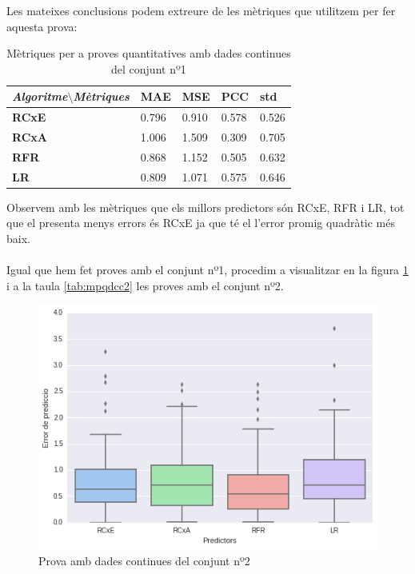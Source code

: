 \documentclass[12pt,a4paper,catalan]{article}
\begin{document}
Les mateixes conclusions podem extreure de les mètriques que utilitzem per fer aquesta prova:

\begin{table}[h]
\centering
\begin{tabular}{lllll}
\hline
\textit{\textbf{Algoritme$\setminus$Mètriques}} & \textbf{MAE} & \textbf{MSE} & \textbf{PCC} & \textbf{std} \\ \hline
\textbf{RCxE}          & 0.796          & 0.910          & 0.578          & 0.526          \\
\textbf{RCxA}          & 1.006          & 1.509          & 0.309          & 0.705          \\
\textbf{RFR}           & 0.868          & 1.152          & 0.505          & 0.632          \\
\textbf{LR}            & 0.809          & 1.071          & 0.575          & 0.646          \\ \hline
\end{tabular}
\caption{Mètriques per a proves quantitatives amb dades continues del conjunt nº1}
\label{tab:mpqdctp}
\end{table}

Observem amb les mètriques que els millors predictors són RCxE, RFR i LR, tot que el presenta menys errors és RCxE ja que té el l'error promig quadràtic més baix.
\\
\\
Igual que hem fet proves amb el conjunt nº1, procedim a visualitzar en la figura \ref{fig:pdctps} i a la taula \ref{tab:mpqdcc2} les proves amb el conjunt nº2.

\begin{figure}[h]
\centering
\includegraphics[width=.7\linewidth]{img/boxplot_primersegon_tercer.png}
\caption{Prova amb dades continues del conjunt nº2}
\label{fig:pdctps}
\end{figure}
\end{document}
